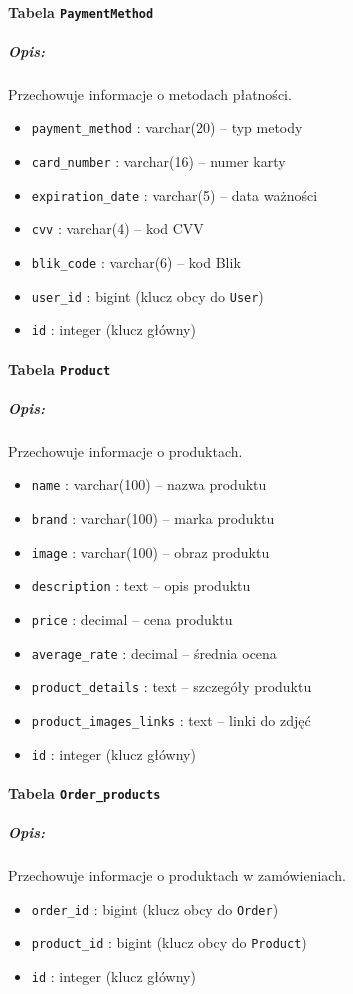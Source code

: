 \documentclass[12pt,a4paper,oneside]{article}
\theoremstyle{definition}
\numberwithin{equation}{section}
\begin{document}
\paragraph{Tabela \texttt{PaymentMethod}}
\subparagraph{Opis:} Przechowuje informacje o metodach płatności.
\begin{itemize}
    \item \texttt{payment\string_method} : varchar(20) – typ metody
    \item \texttt{card\string_number} : varchar(16) – numer karty
    \item \texttt{expiration\string_date} : varchar(5) – data ważności
    \item \texttt{cvv} : varchar(4) – kod CVV
    \item \texttt{blik\string_code} : varchar(6) – kod Blik
    \item \texttt{user\string_id} : bigint (klucz obcy do \texttt{User})
    \item \texttt{id} : integer (klucz główny)
\end{itemize}

\paragraph{Tabela \texttt{Product}}
\subparagraph{Opis:} Przechowuje informacje o produktach.
\begin{itemize}
    \item \texttt{name} : varchar(100) – nazwa produktu
    \item \texttt{brand} : varchar(100) – marka produktu
    \item \texttt{image} : varchar(100) – obraz produktu
    \item \texttt{description} : text – opis produktu
    \item \texttt{price} : decimal – cena produktu
    \item \texttt{average\string_rate} : decimal – średnia ocena
    \item \texttt{product\string_details} : text – szczegóły produktu
    \item \texttt{product\string_images\string_links} : text – linki do zdjęć
    \item \texttt{id} : integer (klucz główny)
\end{itemize}

\paragraph{Tabela \texttt{Order\string_products}}
\subparagraph{Opis:} Przechowuje informacje o produktach w zamówieniach.
\begin{itemize}
    \item \texttt{order\string_id} : bigint (klucz obcy do \texttt{Order})
    \item \texttt{product\string_id} : bigint (klucz obcy do \texttt{Product})
    \item \texttt{id} : integer (klucz główny)
\end{itemize}
\end{document}
